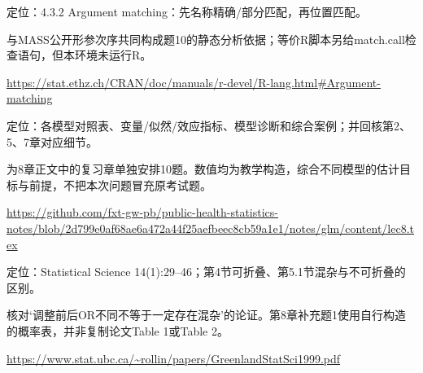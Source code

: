 \par\noindent\begin{minipage}{\linewidth}\raggedright{}\label{src:G7-R-LANGUAGE}
\par
定位：4.3.2 Argument matching：先名称精确/部分匹配，再位置匹配。\par
与MASS公开形参次序共同构成题10的静态分析依据；等价R脚本另给match.call检查语句，但本环境未运行R。\par
{\small \url{https://stat.ethz.ch/CRAN/doc/manuals/r-devel/R-lang.html#Argument-matching}}\par
\end{minipage}\par\medskip

\par\noindent\begin{minipage}{\linewidth}\raggedright{}\label{src:G8-NOTES}
\par
定位：各模型对照表、变量/似然/效应指标、模型诊断和综合案例；并回核第2、5、7章对应细节。\par
为8章正文中的复习章单独安排10题。数值均为教学构造，综合不同模型的估计目标与前提，不把本次问题冒充原考试题。\par
{\small \url{https://github.com/fxt-gw-pb/public-health-statistics-notes/blob/2d799e0af68ae6a472a44f25aefbeec8cb59a1e1/notes/glm/content/lec8.tex}}\par
\end{minipage}\par\medskip

\par\noindent\begin{minipage}{\linewidth}\raggedright{}\label{src:G8-NONCOLL}
\par
定位：Statistical Science 14(1):29–46；第4节可折叠、第5.1节混杂与不可折叠的区别。\par
核对‘调整前后OR不同不等于一定存在混杂’的论证。第8章补充题1使用自行构造的概率表，并非复制论文Table 1或Table 2。\par
{\small \url{https://www.stat.ubc.ca/~rollin/papers/GreenlandStatSci1999.pdf}}\par
\end{minipage}\par\medskip

